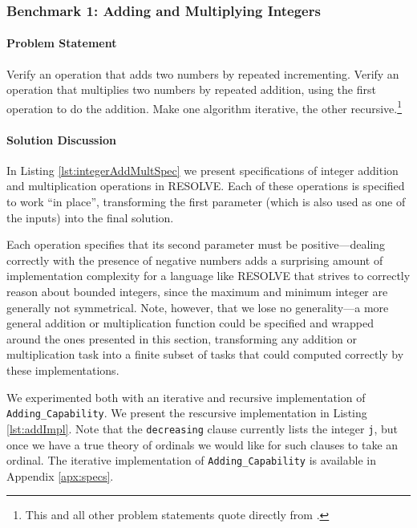 		\subsubsection{Benchmark 1: Adding and Multiplying Integers}	%

\paragraph{Problem Statement}Verify an operation that adds two numbers by repeated incrementing. Verify an operation that multiplies two numbers by repeated addition, using the first operation to do the addition. Make one algorithm iterative, the other recursive.\footnote{This and all other problem statements quote directly from \cite{Benchmarks}.}

\paragraph{Solution Discussion}In Listing \ref{lst:integerAddMultSpec} we present specifications of integer addition and multiplication operations in RESOLVE.  Each of these operations is specified to work ``in place'', transforming the first parameter (which is also used as one of the inputs) into the final solution.



Each operation specifies that its second parameter must be positive---dealing correctly with the presence of negative numbers adds a surprising amount of implementation complexity for a language like RESOLVE that strives to correctly reason about bounded integers, since the maximum and minimum integer are generally not symmetrical.  Note, however, that we lose no generality---a more general addition or multiplication function could be specified and wrapped around the ones presented in this section, transforming any addition or multiplication task into a finite subset of tasks that could computed correctly by these implementations.

We experimented both with an iterative and recursive implementation of \texttt{Adding\_Capability}.  We present the rescursive implementation in Listing \ref{lst:addImpl}.  Note that the \texttt{decreasing} clause currently lists the integer \texttt{j}, but once we have a true theory of ordinals we would like for such clauses to take an ordinal.  The iterative implementation of \texttt{Adding\_Capability} is available in Appendix \ref{apx:specs}.

